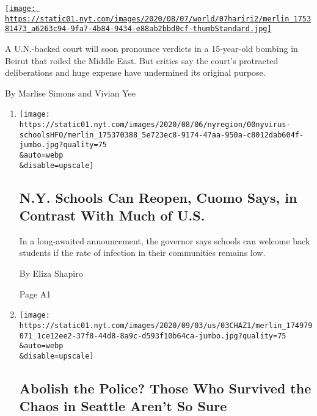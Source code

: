 \begin{enumerate}
\begin{enumerate}
    \href{/2020/08/08/world/middleeast/hariri-assassination-trial-hague.html}{\texttt{[image: https://static01.nyt.com/images/2020/08/07/world/07hariri2/merlin\_175381473\_a6263c94-9fa7-4b84-9434-e88ab2bbd0cf-thumbStandard.jpg]}}

    A U.N.-backed court will soon pronounce verdicts in a 15-year-old
    bombing in Beirut that roiled the Middle East. But critics say the
    court's protracted deliberations and huge expense have undermined
    its original purpose.

    By Marlise Simons and Vivian Yee
  \end{enumerate}
\end{enumerate}

\begin{enumerate}
\def\labelenumi{\arabic{enumi}.}
\item
  \href{/2020/08/07/nyregion/cuomo-schools-reopening.html}{}

  \texttt{[image: https://static01.nyt.com/images/2020/08/06/nyregion/00nyvirus-schoolsHFO/merlin\_175370388\_5e723ec8-9174-47aa-950a-c8012dab604f-jumbo.jpg?quality=75\\\&auto=webp\\\&disable=upscale]}

  \hypertarget{ny-schools-can-reopen-cuomo-says-in-contrast-with-much-of-us}{%
  \subsection{N.Y. Schools Can Reopen, Cuomo Says, in Contrast With Much
  of
  U.S.}\label{ny-schools-can-reopen-cuomo-says-in-contrast-with-much-of-us}}

  In a long-awaited announcement, the governor says schools can welcome
  back students if the rate of infection in their communities remains
  low.

  By Eliza Shapiro

  Page A1
\item
  \href{/2020/08/07/us/defund-police-seattle-protests.html}{}

  \texttt{[image: https://static01.nyt.com/images/2020/09/03/us/03CHAZ1/merlin\_174979071\_1ce12ee2-37f8-44d8-8a9c-d593f10b64ca-jumbo.jpg?quality=75\\\&auto=webp\\\&disable=upscale]}

  \hypertarget{abolish-the-police-those-who-survived-the-chaos-in-seattle-arent-so-sure}{%
  \subsection{Abolish the Police? Those Who Survived the Chaos in
  Seattle Aren't So
  Sure}\label{abolish-the-police-those-who-survived-the-chaos-in-seattle-arent-so-sure}}


\end{enumerate}
